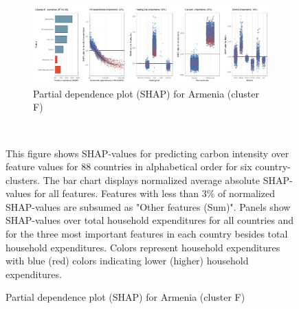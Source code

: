 \begin{figure}[ht!]
    \\
    \vspace{0.5cm}
   \begin{subfigure}[b]{\textwidth}
    \centering
         \caption{Partial dependence plot (SHAP) for Armenia (cluster F)}
         \label{fig:5b_ARM}
         \includegraphics[width=\textwidth]{Figure 5b/Figure_5b_ARM} 
    \end{subfigure}
    \\
    \vspace{0.5cm}
   
    \begin{subcaption2}
     This figure shows SHAP-values for predicting carbon intensity over feature values for 88 countries in alphabetical order for six country-clusters. The bar chart displays normalized average absolute SHAP-values for all features. Features with less than 3\% of normalized SHAP-values are subsumed as "Other features (Sum)". Panels show SHAP-values over total household expenditures for all countries and for the three most important features in each country besides total household expenditures. Colors represent household expenditures with blue (red) colors indicating lower (higher) household expenditures.
     \end{subcaption2}
\end{figure}

\clearpage

